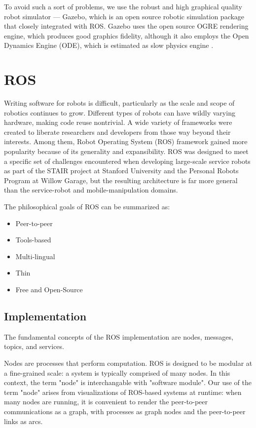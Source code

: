 To avoid such a sort of problems, we use the robust and high graphical quality robot simulator --- Gazebo, which is an open source robotic simulation package that closely integrated with ROS. Gazebo uses the open source OGRE rendering engine, which produces good graphics fidelity, although it also employs the Open Dynamics Engine (ODE), which is estimated as slow physics engine \cite{jmeSim2012}.

\section{ROS}

Writing software for robots is difficult, particularly as the scale and scope of robotics continues to grow. Different types of robots can have wildly varying hardware, making code reuse nontrivial. A wide variety of frameworks were created to liberate researchers and developers from those way beyond their interests. Among them, Robot Operating System (ROS) framework \cite{ROS2009}  gained more popularity because of its generality and expansibility. ROS was designed to meet a specific set of challenges encountered when developing large-scale service robots as part of the STAIR project \cite{STAIR2007} at Stanford University and the Personal Robots Program \cite{PR2008} at Willow Garage, but the resulting architecture is far more general than the service-robot and mobile-manipulation domains.

The philosophical goals of ROS can be summarized as:

\begin{itemize}
\item Peer-to-peer 
\item Tools-based 
\item Multi-lingual 
\item Thin
\item Free and Open-Source
\end{itemize}

\subsection{Implementation}

The fundamental concepts of the ROS implementation are nodes, messages, topics, and services.

Nodes are processes that perform computation. ROS is designed to be modular at a fine-grained scale: a system is typically comprised of many nodes. In this context, the term "node" is interchangable with "software module". Our use of the term "node" arises from visualizations of ROS-based systems at runtime: when many nodes are running, it is convenient to render the peer-to-peer communications as a graph, with processes as graph nodes and the peer-to-peer links as arcs.

